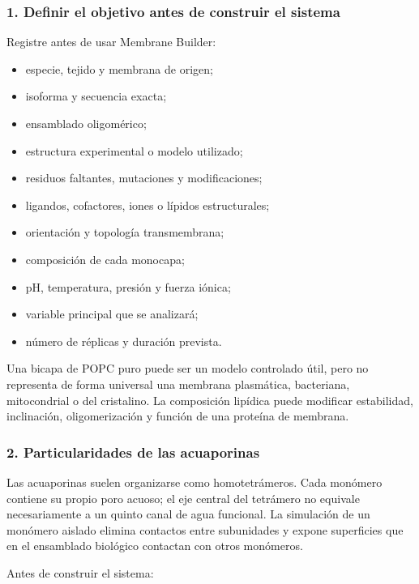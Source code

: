 \documentclass[
  spanish,
  11pt,
  a4paper]{article}
\providecommand{\tightlist}{%
  \setlength{\itemsep}{0pt}\setlength{\parskip}{0pt}}
\begin{document}
\subsubsection{1. Definir el objetivo antes de construir el
sistema}\label{definir-el-objetivo-antes-de-construir-el-sistema}

Registre antes de usar Membrane Builder:

\begin{itemize}
\tightlist
\item
  especie, tejido y membrana de origen;
\item
  isoforma y secuencia exacta;
\item
  ensamblado oligomérico;
\item
  estructura experimental o modelo utilizado;
\item
  residuos faltantes, mutaciones y modificaciones;
\item
  ligandos, cofactores, iones o lípidos estructurales;
\item
  orientación y topología transmembrana;
\item
  composición de cada monocapa;
\item
  pH, temperatura, presión y fuerza iónica;
\item
  variable principal que se analizará;
\item
  número de réplicas y duración prevista.
\end{itemize}

Una bicapa de POPC puro puede ser un modelo controlado útil, pero no
representa de forma universal una membrana plasmática, bacteriana,
mitocondrial o del cristalino. La composición lipídica puede modificar
estabilidad, inclinación, oligomerización y función de una proteína de
membrana.

\subsubsection{2. Particularidades de las
acuaporinas}\label{particularidades-de-las-acuaporinas}

Las acuaporinas suelen organizarse como homotetrámeros. Cada monómero
contiene su propio poro acuoso; el eje central del tetrámero no equivale
necesariamente a un quinto canal de agua funcional. La simulación de un
monómero aislado elimina contactos entre subunidades y expone
superficies que en el ensamblado biológico contactan con otros
monómeros.

Antes de construir el sistema:
\end{document}
